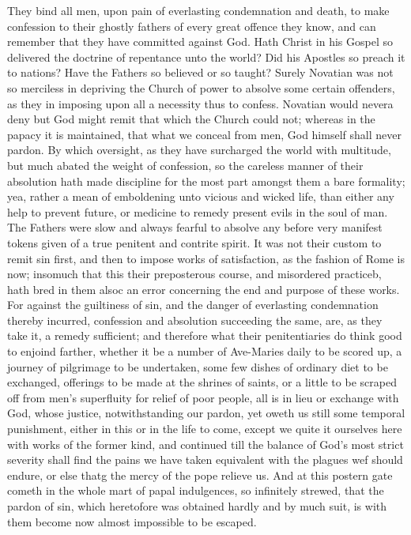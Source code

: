 They bind all men, upon pain of everlasting condemnation and death, to make confession to their ghostly fathers of every great offence they know, and can remember that they have committed against God. Hath Christ in his Gospel so delivered the doctrine of repentance unto the world? Did his Apostles so preach it to nations? Have the Fathers so believed or so taught? Surely Novatian was not so merciless in depriving the Church of power to absolve some certain offenders, as they in imposing upon all a necessity thus to confess. Novatian would nevera deny but God might remit that which the Church could not; whereas in the papacy it is maintained, that what we conceal from men, God himself shall never pardon. By which oversight, as they have surcharged the world with multitude, but much abated the weight of confession, so the careless manner of their absolution hath made discipline for the most part amongst them a bare formality; yea, rather a mean of emboldening unto vicious and wicked life, than either any help to prevent future, or medicine to remedy present evils in the soul of man. The Fathers were slow and always fearful to absolve any before very manifest tokens given of a true penitent and contrite spirit. It was not their custom to remit sin first, and then to impose works of satisfaction, as the fashion of Rome is now; insomuch that this their preposterous course, and misordered practiceb, hath bred in them alsoc an error concerning the end and purpose of these works. For against the guiltiness of sin, and the danger of everlasting condemnation thereby incurred, confession and absolution succeeding the same, are, as they take it, a remedy sufficient; and therefore what their penitentiaries do think good to enjoind farther,  whether it be a number of Ave-Maries daily to be scored up, a journey of pilgrimage to be undertaken, some few dishes of ordinary diet to be exchanged, offerings to be made at the shrines of saints, or a little to be scraped off from men’s superfluity for relief of poor people, all is in lieu or exchange with God, whose justice, notwithstanding our pardon, yet oweth us still some temporal punishment, either in this or in the life to come, except we quite it ourselves here with works of the former kind, and continued till the balance of God’s most strict severity shall find the pains we have taken equivalent with the plagues wef should endure, or else thatg the mercy of the pope relieve us. And at this postern gate cometh in the whole mart of papal indulgences, so infinitely strewed, that the pardon of sin, which heretofore was obtained hardly and by much suit, is with them become now almost impossible to be escaped.

